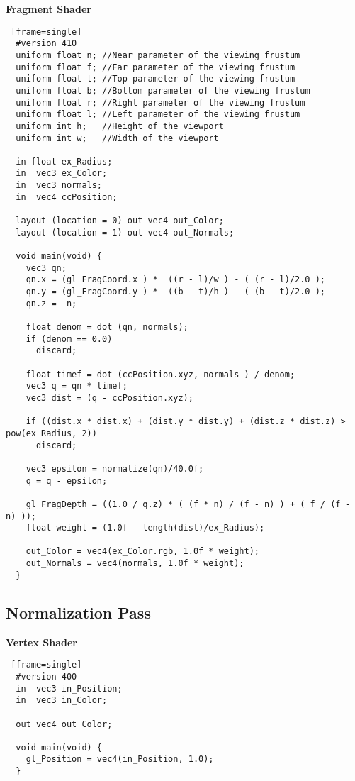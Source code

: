 \textbf{Fragment Shader}
\begin{lstlisting} [frame=single]
  #version 410
  uniform float n; //Near parameter of the viewing frustum
  uniform float f; //Far parameter of the viewing frustum
  uniform float t; //Top parameter of the viewing frustum
  uniform float b; //Bottom parameter of the viewing frustum
  uniform float r; //Right parameter of the viewing frustum
  uniform float l; //Left parameter of the viewing frustum
  uniform int h;   //Height of the viewport
  uniform int w;   //Width of the viewport

  in float ex_Radius;
  in  vec3 ex_Color;
  in  vec3 normals;
  in  vec4 ccPosition;

  layout (location = 0) out vec4 out_Color;
  layout (location = 1) out vec4 out_Normals;

  void main(void) {
    vec3 qn;
    qn.x = (gl_FragCoord.x ) *  ((r - l)/w ) - ( (r - l)/2.0 );
    qn.y = (gl_FragCoord.y ) *  ((b - t)/h ) - ( (b - t)/2.0 );
    qn.z = -n;

    float denom = dot (qn, normals);
    if (denom == 0.0)
      discard;

    float timef = dot (ccPosition.xyz, normals ) / denom;
    vec3 q = qn * timef;
    vec3 dist = (q - ccPosition.xyz);

    if ((dist.x * dist.x) + (dist.y * dist.y) + (dist.z * dist.z) > pow(ex_Radius, 2))
      discard;

    vec3 epsilon = normalize(qn)/40.0f;
    q = q - epsilon;

    gl_FragDepth = ((1.0 / q.z) * ( (f * n) / (f - n) ) + ( f / (f - n) ));
    float weight = (1.0f - length(dist)/ex_Radius);

    out_Color = vec4(ex_Color.rgb, 1.0f * weight); 
    out_Normals = vec4(normals, 1.0f * weight);
  }
\end{lstlisting}
\newpage

\subsection{Normalization Pass}
\textbf{Vertex Shader}
\begin{lstlisting} [frame=single]
  #version 400
  in  vec3 in_Position;
  in  vec3 in_Color;

  out vec4 out_Color;

  void main(void) {
    gl_Position = vec4(in_Position, 1.0);
  }
\end{lstlisting}

